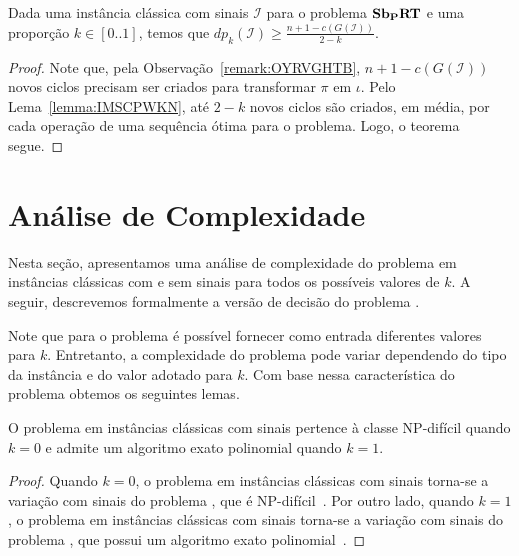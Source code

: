 \begin{theorem}\label{theorem:WSTPPSMD}
Dada uma instância clássica com sinais $\mathcal{I}$ para o problema $\textbf{Sb\textsubscript{P}RT}{}$ e uma proporção $k \in [0..1]$, temos que $dp_{k}(\mathcal{I}) \ge \frac{n + 1 - c(G(\mathcal{I}))}{2-k}$.
\end{theorem}
\begin{proof}
Note que, pela Observação~\ref{remark:OYRVGHTB}, $n+1 - c(G(\mathcal{I}))$ novos ciclos precisam ser criados para transformar $\pi$ em $\iota$. Pelo Lema~\ref{lemma:IMSCPWKN}, até $2-k$ novos ciclos são criados, em média, por cada operação de uma sequência ótima para o problema. Logo, o teorema segue.
\end{proof}

\section{Análise de Complexidade}

Nesta seção, apresentamos uma análise de complexidade do problema \SbPRT{} em instâncias clássicas com e sem sinais para todos os possíveis valores de $k$. A seguir, descrevemos formalmente a versão de decisão do problema \SbPRT{}.

\begin{decision}
\end{decision}

Note que para o problema \SbPRT{} é possível fornecer como entrada diferentes valores para $k$. Entretanto, a complexidade do problema pode variar dependendo do tipo da instância e do valor adotado para $k$. Com base nessa característica do problema obtemos os seguintes lemas.

\begin{lemma}
O problema \SbPRT{} em instâncias clássicas com sinais pertence à classe NP-difícil quando $k=0$ e admite um algoritmo exato polinomial quando $k=1$.
\end{lemma}
\begin{proof}
Quando $k=0$, o problema \SbPRT{} em instâncias clássicas com sinais torna-se a variação com sinais do problema \SbRT{}, que é NP-difícil~\cite{2019b-oliveira-etal}. Por outro lado, quando $k=1$, o problema \SbPRT{} em instâncias clássicas com sinais torna-se a variação com sinais do problema \SbR{}, que possui um algoritmo exato polinomial~\cite{1999-hannenhalli-pevzner}.
\end{proof}

